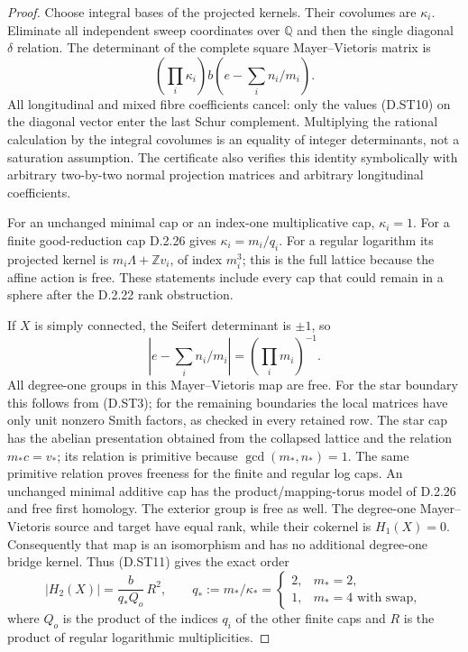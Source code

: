 \begin{proof}
Choose integral bases of the projected kernels. Their
covolumes are $\kappa_i$. Eliminate all independent sweep
coordinates over $\mathbb Q$ and then the single diagonal
$\delta$ relation. The determinant of the complete square
Mayer--Vietoris matrix is
\[
 \left(\prod_i\kappa_i\right)
                   b\left(e-\sum_i n_i/m_i\right).         \tag{D.ST11}
\]
All longitudinal and mixed fibre coefficients cancel: only
the values (D.ST10) on the diagonal vector enter the last
Schur complement. Multiplying the rational calculation by the
integral covolumes is an equality of integer determinants,
not a saturation assumption. The certificate also verifies
this identity symbolically with arbitrary two-by-two normal
projection matrices and arbitrary longitudinal coefficients.

For an unchanged minimal cap or an index-one multiplicative
cap, $\kappa_i=1$. For a finite good-reduction cap D.2.26 gives
$\kappa_i=m_i/q_i$. For a regular logarithm its projected
kernel is $m_i\Lambda+\mathbb Z v_i$, of index $m_i^3$;
this is the full lattice because the affine action is free.
These statements include every cap that could remain in a
sphere after the D.2.22 rank obstruction.

If $X$ is simply connected, the Seifert determinant is $\pm1$,
so
\[
 \left|e-\sum_i n_i/m_i\right|=(\prod_i m_i)^{-1}.
\]
All degree-one groups in this Mayer--Vietoris map are free.
For the star boundary this follows from (D.ST3); for the
remaining boundaries the local matrices have only unit
nonzero Smith factors, as checked in every retained row.
The star cap has the abelian presentation obtained from the
collapsed lattice and the relation $m_*c=v_*$; its relation
is primitive because $\gcd(m_*,n_*)=1$. The same primitive
relation proves freeness for the finite and regular log caps.
An unchanged minimal additive cap has the product/mapping-torus
model of D.2.26 and free first homology. The exterior group is
free as well. The degree-one Mayer--Vietoris source and target
have equal rank, while their cokernel is $H_1(X)=0$.
Consequently that map is an isomorphism and has no additional
degree-one bridge kernel.
Thus (D.ST11) gives the exact order
\[
 |H_2(X)|=\frac{b}{q_*Q_o}\,R^2,\qquad
 q_*:=m_*/\kappa_*=
 \begin{cases}2,&m_*=2,\\1,&m_*=4\text{ with swap},\end{cases} \tag{D.ST12}
\]
where $Q_o$ is the product of the indices $q_i$ of the other
finite caps and $R$ is the product of regular logarithmic
multiplicities.


\end{proof}
